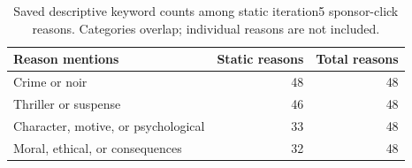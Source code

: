 \begin{table}[htbp!]
\centering
\small
\setlength{\tabcolsep}{3pt}
\renewcommand{\arraystretch}{1.1}
\begin{tabular}{lrr}
\hline
Reason mentions & Static reasons & Total reasons \\
\hline
Crime or noir & 48 & 48 \\
Thriller or suspense & 46 & 48 \\
Character, motive, or psychological & 33 & 48 \\
Moral, ethical, or consequences & 32 & 48 \\
\hline
\end{tabular}
\caption{Saved descriptive keyword counts among static iteration5 sponsor-click reasons. Categories overlap; individual reasons are not included.}
\label{chap:results:tab:rq1_spike_reason_keywords}
\end{table}
